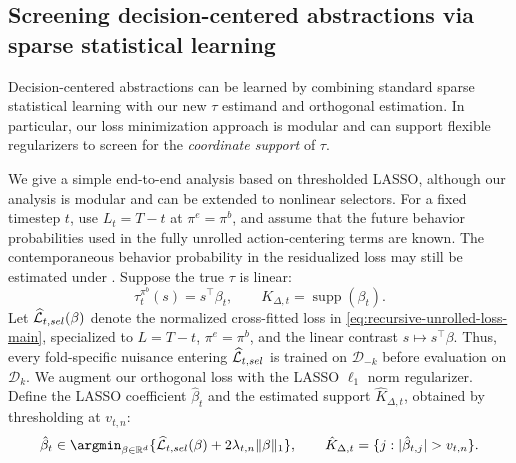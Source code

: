 \documentclass[opre,nonblindrev]{informs4}
\newenvironment{revision}{\begingroup\color{revisionblue}\ignorespaces}{\endgroup}
\let\arxivSavedArgmin\argmin
\let\argmin\undefined
\let\argmin\arxivSavedArgmin
\newcommand{\norm}[1]{\lVert#1\rVert}
\newcommand{\blipadv}{\tau}
\begin{document}
\begin{revision}
\subsection{Screening decision-centered abstractions via sparse statistical learning}
Decision-centered abstractions can be learned by combining standard sparse statistical learning with our new $\blipadv$ estimand and orthogonal estimation. In particular, our loss minimization approach is modular and can support flexible regularizers to screen for the \textit{coordinate support} of $\tau$. 

We give a simple end-to-end analysis based on thresholded LASSO, although our analysis is modular and can be extended to nonlinear selectors. For a fixed timestep $t$,
use $L_t=T-t$ at $\pi^e=\pi^b$, and assume that the future behavior
probabilities used in the fully unrolled action-centering terms are known.
The contemporaneous behavior probability in the residualized loss may still
be estimated under . Suppose the true $\blipadv$ is linear: 
\[
\blipadv_t^{\pi^b}(s)=s^\top\beta_t,
\qquad
K_{\Delta,t}=\operatorname{supp}(\beta_t).
\]
Let $\widehat{\mathcal L}_{t,\rm sel}(\beta)$ denote the normalized
cross-fitted loss in \eqref{eq:recursive-unrolled-loss-main}, specialized to
$L=T-t$, $\pi^e=\pi^b$, and the linear contrast
$s\mapsto s^\top\beta$. Thus, every fold-specific nuisance entering
$\widehat{\mathcal L}_{t,\rm sel}$ is trained on $\mathcal D_{-k}$
before evaluation on $\mathcal D_k$. We augment our orthogonal loss with the LASSO $\ell_1$ norm regularizer. Define the LASSO coefficient $\hat\beta_t$ and the estimated support $\hat K_{\Delta,t}$, obtained by thresholding at $v_{t,n}:$
\begin{equation*}\textstyle 
\hat\beta_t
\in
\argmin_{\beta\in\mathbb R^d}
\{
    \widehat{\mathcal L}_{t,\rm sel}(\beta)
    +2\lambda_{t,n}\norm{\beta}_1
\},
\qquad
\hat K_{\Delta,t}
=
\{j:|\hat\beta_{t,j}|>v_{t,n}\}.
\end{equation*}


\end{revision}
\end{document}
